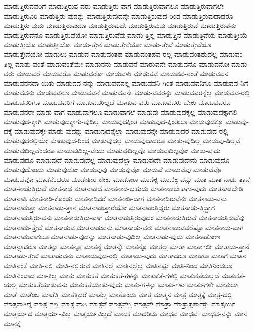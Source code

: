 {ಮಾಡುತ್ತಿರುವವರಿಗೆ
ಮಾಡುತ್ತಿರುವ-ವರು
ಮಾಡುತ್ತಿರು-ವಾಗ
ಮಾಡುತ್ತಿರುವಾಗಲೂ
ಮಾಡುತ್ತಿರುವಾಗಲೇ
ಮಾಡುತ್ತಿರುವಿರಿ
ಮಾಡುತ್ತಿರು-ವುದನ್ನು
ಮಾಡುತ್ತಿರುವುದನ್ನೇ
ಮಾಡುತ್ತಿರುವುದ-ರಿಂದ
ಮಾಡುತ್ತಿರುವುದಾದರೂ
ಮಾಡುತ್ತಿರು-ವುದು
ಮಾಡುತ್ತಿರುವುದೂ
ಮಾಡುತ್ತಿರುವುದೇ
ಮಾಡುತ್ತಿರುವುವು
ಮಾಡುತ್ತಿರುವೆ
ಮಾಡುತ್ತಿರುವೆನು
ಮಾಡುತ್ತಿರುವೆನೊ
ಮಾಡುತ್ತಿರುವೆಯೋ
ಮಾಡುತ್ತಿರುವೆವು
ಮಾಡು-ತ್ತಿಲ್ಲ
ಮಾಡುತ್ತಿವೆ
ಮಾಡುತ್ತಿವೆಯೆ
ಮಾಡುತ್ತೀಯೆ
ಮಾಡುತ್ತೀಯೊ
ಮಾಡುತ್ತೀಯೋ
ಮಾಡು-ತ್ತೇನೆ
ಮಾಡುತ್ತೇನೆಯೋ
ಮಾಡು-ತ್ತೇವೆ
ಮಾಡುತ್ತೇವೆಯೊ
ಮಾಡುತ್ತೇವೆಯೋ
ಮಾಡುಲು
ಮಾಡುವ
ಮಾಡುವಂತಹ
ಮಾಡುವಂತಹವ-ರಲ್ಲ
ಮಾಡುವಂತಹುದಲ್ಲ
ಮಾಡುವಂ-ತಿಲ್ಲ
ಮಾಡು-ವಂತೆ
ಮಾಡುವಂತೆಯೇ
ಮಾಡುವನು
ಮಾಡುವನೆ
ಮಾಡುವನೇ
ಮಾಡುವನೊ
ಮಾಡುವನೋ
ಮಾಡು-ವರು
ಮಾಡುವರೆ
ಮಾಡುವರೊ
ಮಾಡುವರೋ
ಮಾಡುವಳು
ಮಾಡುವವ
ಮಾಡುವವ-ನಂತೆ
ಮಾಡುವವನ
ಮಾಡುವವನದಾ-ಯಿತು
ಮಾಡುವವ-ನನ್ನು
ಮಾಡುವವನಲ್ಲ
ಮಾಡುವವನಿ-ಗಿಂತ
ಮಾಡುವವನಿಗೂ
ಮಾಡುವವ-ನಿಗೆ
ಮಾಡುವವನು
ಮಾಡುವವನೂ
ಮಾಡುವವನೆ
ಮಾಡುವವನೇ
ಮಾಡು-ವವರನ್ನು
ಮಾಡುವವರನ್ನೆಲ್ಲ
ಮಾಡುವವ-ರಲ್ಲಿ
ಮಾಡುವವರಿಗೂ
ಮಾಡುವವರಿಗೆ
ಮಾಡುವವರಿಲ್ಲದೆ
ಮಾಡುವ-ವರು
ಮಾಡುವವರು-ಬೇಕು
ಮಾಡುವವರೂ
ಮಾಡುವವರೇ
ಮಾಡು-ವಾಗ
ಮಾಡುವಾಗಲೂ
ಮಾಡುವಾಗಲೆ
ಮಾಡುವು
ಮಾಡುವುದಕ್ಕಲ್ಲ
ಮಾಡುವುದಕ್ಕಾಗಲಿ
ಮಾಡುವುದ-ಕ್ಕಾಗಿ
ಮಾಡುವುದಕ್ಕಾಗು-ವುದಿಲ್ಲ
ಮಾಡುವುದಕ್ಕಿಂತ
ಮಾಡುವುದ-ಕ್ಕಿಂತಲೂ
ಮಾಡುವುದಕ್ಕೂ
ಮಾಡುವು-ದಕ್ಕೆ
ಮಾಡುವುದಕ್ಕೇ
ಮಾಡು-ವುದನ್ನು
ಮಾಡುವುದನ್ನೆಲ್ಲಾ
ಮಾಡುವುದನ್ನೇ
ಮಾಡುವುದರ
ಮಾಡುವುದ-ರಲ್ಲಿ
ಮಾಡುವುದರಲ್ಲಿಯೇ
ಮಾಡುವುದ-ರಿಂದ
ಮಾಡುವುದಲ್ಲ
ಮಾಡುವುದಾದರೂ
ಮಾಡು-ವುದಿಲ್ಲ
ಮಾಡುವು-ದಿಲ್ಲವೆ
ಮಾಡುವುದಿಲ್ಲವೆಂದರೂ
ಮಾಡುವುದಿಲ್ಲ-ವೆಂದು
ಮಾಡುವುದಿಲ್ಲವೊ
ಮಾಡುವುದಿಲ್ಲವೋ
ಮಾಡು-ವುದು
ಮಾಡುವುದೂ
ಮಾಡುವುದೆ
ಮಾಡುವುದೆಲ್ಲ
ಮಾಡುವುದೆಲ್ಲಾ
ಮಾಡುವುದೇ
ಮಾಡುವುದೇನು
ಮಾಡುವುದೊ
ಮಾಡುವುದೊಂದು
ಮಾಡುವುದೋ
ಮಾಡುವುವು
ಮಾಡುವುವೋ
ಮಾಡುವೆ
ಮಾಡುವೆವು
ಮಾಡುವೆವೊ
ಮಾಡುವೆವೋ
ಮಾಡೆನೆಂದರೂ
ಮಾಡೇತೀರ-ಬೇಕು
ಮಾಡೋಣ
ಮಾಣಿಕ್ಯ
ಮಾಣಿಕ್ಯ-ವನ್ನು
ಮಾತ
ಮಾತ-ನಾಡು-ತ್ತಾನೆ
ಮಾತ-ನಾಡುತ್ತಿರುವೆ
ಮಾತನಾಡ
ಮಾತನಾಡದೆ
ಮಾತನಾಡ-ಬಹುದು
ಮಾತನಾಡಬೇಕಾಗು-ವುದು
ಮಾತನಾಡಬೇಡಿ
ಮಾತನಾಡಿ
ಮಾತನಾಡಿ-ಕೊಂಡು
ಮಾತನಾಡಿದರೆ
ಮಾತನಾಡಿ-ದಾಗ
ಮಾತನಾಡಿರುವೆನು
ಮಾತನಾಡು-ವನು
ಮಾತನಾಡುತ್ತಾ
ಮಾತನಾಡು-ತ್ತಾನೆ
ಮಾತನಾಡುತ್ತಾರೆಯೋ
ಮಾತನಾಡುತ್ತಿದ್ದರು
ಮಾತನಾಡು-ತ್ತಿದ್ದಾಗ
ಮಾತನಾಡುತ್ತಿರು-ವನು
ಮಾತನಾಡುತ್ತಿರು-ವಾಗ
ಮಾತನಾಡುತ್ತಿರುವುದರ
ಮಾತನಾಡುತ್ತಿರುವೆ
ಮಾತನಾಡುತ್ತಿರುವೆವು
ಮಾತನಾಡು-ತ್ತೇವೆ
ಮಾತನಾಡುವ
ಮಾತನಾಡುವನು
ಮಾತನಾಡು-ವರು
ಮಾತನಾಡುವವರೆಷ್ಟೊ
ಮಾತನಾಡು-ವಾಗ
ಮಾತನಾಡುವಾಗಲೂ
ಮಾತನಾಡು-ವುದನ್ನು
ಮಾತನಾಡು-ವುದಿಲ್ಲ
ಮಾತನಾಡು-ವುದು
ಮಾತನಾಡೋಣ
ಮಾತನ್ನಾದರೂ
ಮಾತನ್ನು
ಮಾತನ್ನೂ
ಮಾತನ್ನೆ
ಮಾತನ್ನೇ
ಮಾತನ್ನೊ
ಮಾತಲ್ಲ
ಮಾತಾ
ಮಾತಾಗಲೀ
ಮಾತಾಡು-ತ್ತಾನೆ
ಮಾತಾಡು-ತ್ತೇವೆ
ಮಾತಾಡುವನು
ಮಾತಾಡುವುದ-ರಲ್ಲಿ
ಮಾತಾಡು-ವುದು
ಮಾತಾದರೂ
ಮಾತಿಗೂ
ಮಾತಿಗೆ
ಮಾತಿನ
ಮಾತಿನಂತೆ
ಮಾತಿ-ನಲ್ಲಿ
ಮಾತಿ-ನಲ್ಲಿರುವ
ಮಾತಿನಲ್ಲೆ
ಮಾತಿನಲ್ಲೆಲ್ಲ
ಮಾತಿನಷ್ಟು
ಮಾತಿ-ನಿಂದ
ಮಾತಿನಿಂದಲೂ
ಮಾತಿನಿಂದಾದ
ಮಾ-ತಿಲ್ಲ
ಮಾತು
ಮಾತುಕತೆ
ಮಾತುಕತೆ-ಗಳನ್ನು
ಮಾತುಕತೆ-ಗಳಲ್ಲಿ
ಮಾತುಕತೆಯಲ್ಲದೆ
ಮಾತುಕತೆ-ಯಲ್ಲಿ
ಮಾತುಕತೆಯಾಡುವನು
ಮಾತುಕತೆಯಾಡು-ವುದು
ಮಾತು-ಗಳನ್ನು
ಮಾತು-ಗಳು
ಮಾತು-ಗಳೇ
ಮಾತುಲಾಃ
ಮಾತೆ
ಮಾತೆಂಬ
ಮಾತೆತ್ತಿ
ಮಾತೆತ್ತಿದರೆ
ಮಾತೆಲ್ಲ
ಮಾತೊಂದು
ಮಾತ್ತ
ಮಾತ್ಮನ
ಮಾತ್ರ
ಮಾತ್ರಕ್ಕೆ
ಮಾತ್ರ-ದಲ್ಲಿ
ಮಾತ್ರನಾಗಿದ್ದ
ಮಾತ್ರ-ವಲ್ಲ
ಮಾತ್ರ-ವಾಗಿ
ಮಾತ್ರವೆ
ಮಾತ್ರವೆಲ್ಲ
ಮಾತ್ರವೇ
ಮಾತ್ರಾ
ಮಾತ್ರಾಸ್ಪರ್ಶಾಸ್ತು
ಮಾತ್ಸರ್ಯ
ಮಾತ್ಸರ್ಯದ
ಮಾತ್ಸರ್ಯ-ವಿಲ್ಲ
ಮಾತ್ಸರ್ಯವಿಲ್ಲದೆ
ಮಾದಕ
ಮಾದರಿಯ
ಮಾಧವ
ಮಾಧವಃ
ಮಾಧವ-ನನ್ನು
ಮಾನ
ಮಾನಕ್ಕೆ
}

